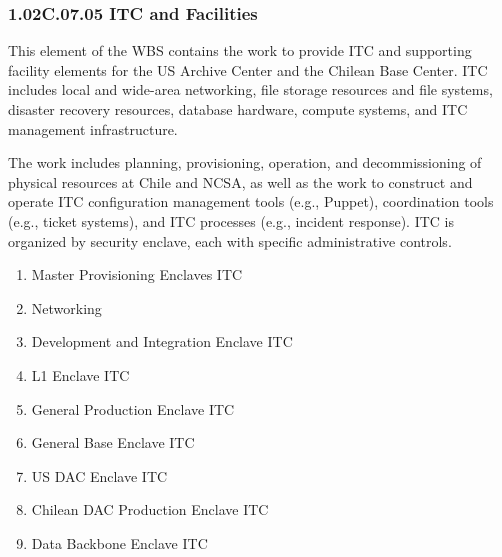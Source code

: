 \subsubsection{1.02C.07.05 ITC and Facilities}

This element of the WBS contains the work to provide ITC and supporting facility elements for the US Archive Center and the Chilean Base Center.
ITC includes local and wide-area networking, file storage resources and file systems, disaster recovery resources, database hardware, compute systems, and ITC management infrastructure.

The work includes planning, provisioning, operation, and decommissioning of physical resources at Chile and NCSA, as well as the work to construct and operate ITC configuration management tools (e.g., Puppet), coordination tools (e.g., ticket systems), and ITC processes (e.g., incident response).
ITC is organized by security enclave, each with specific administrative controls.

\begin{enumerate}

  \item{Master Provisioning Enclaves ITC}
  \item{Networking}
  \item{Development and Integration Enclave ITC}
  \item{L1 Enclave ITC}
  \item{General Production Enclave ITC}
  \item{General Base Enclave ITC}
  \item{US DAC Enclave ITC}
  \item{Chilean DAC Production Enclave ITC}
  \item{Data Backbone Enclave ITC}

\end{enumerate}
